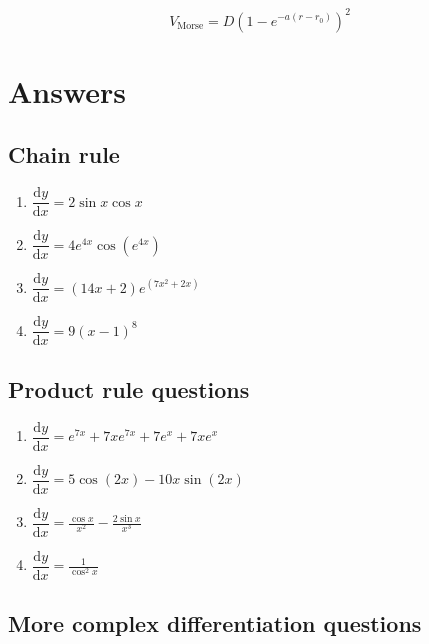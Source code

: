 \documentclass[
]{book}
\providecommand{\tightlist}{%
  \setlength{\itemsep}{0pt}\setlength{\parskip}{0pt}}
\begin{document}
\begin{equation*}
V_{\textrm{Morse}}= D(1-e^{-a(r-r_0)})^2
\end{equation*}

\hypertarget{sec:Answers5}{%
\section{Answers}\label{sec:Answers5}}

\hypertarget{chain-rule-1}{%
\subsection{Chain rule}\label{chain-rule-1}}

\begin{enumerate}
\def\labelenumi{\arabic{enumi}.}
\tightlist
\item
  \(\dfrac{\textrm{d}y}{\textrm{d}x}= 2 \sin x \cos x\)
\item
  \(\dfrac{\textrm{d}y}{\textrm{d}x}=4e^{4x}\cos (e^{4x})\)
\item
  \(\dfrac{\textrm{d}y}{\textrm{d}x}= (14x+2)e^{(7x^2 + 2x)}\)
\item
  \(\dfrac{\textrm{d}y}{\textrm{d}x}= 9 (x-1)^8\)
\end{enumerate}

\hypertarget{product-rule-questions-1}{%
\subsection{Product rule questions}\label{product-rule-questions-1}}

\begin{enumerate}
\def\labelenumi{\arabic{enumi}.}
\tightlist
\item
  \(\dfrac{\textrm{d}y}{\textrm{d}x}=e^{7x}+7xe^{7x}+ 7e^x+7xe^x\)
\item
  \(\dfrac{\textrm{d}y}{\textrm{d}x}=5 \cos (2x)-10x \sin (2x)\)
\item
  \(\dfrac{\textrm{d}y}{\textrm{d}x}= \frac{\cos x}{x^2}-\frac{2\sin x}{x^3}\)
\item
  \(\dfrac{\textrm{d}y}{\textrm{d}x}=\frac{1}{\cos^2 x}\)
\end{enumerate}

\hypertarget{more-complex-differentiation-questions-1}{%
\subsection{More complex differentiation questions}\label{more-complex-differentiation-questions-1}}
\end{document}
